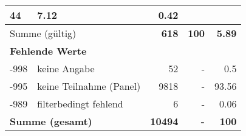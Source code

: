\begin{longtable}{lXrrr}
       \num{44} &
       \num[round-mode=places,round-precision=2]{7.12} &
         \num[round-mode=places,round-precision=2]{0.42} \\
     \midrule
     \multicolumn{2}{l}{Summe (gültig)} &
       \textbf{\num{618}} &
     \textbf{\num{100}} &
       \textbf{\num[round-mode=places,round-precision=2]{5.89}} \\
     \multicolumn{5}{l}{\textbf{Fehlende Werte}}\\
       -998 &
       keine Angabe &
         \num{52} &
        - &
         \num[round-mode=places,round-precision=2]{0.5} \\
       -995 &
       keine Teilnahme (Panel) &
         \num{9818} &
        - &
         \num[round-mode=places,round-precision=2]{93.56} \\
       -989 &
       filterbedingt fehlend &
         \num{6} &
        - &
         \num[round-mode=places,round-precision=2]{0.06} \\
     \midrule
     \multicolumn{2}{l}{\textbf{Summe (gesamt)}} &
          \textbf{\num{10494}} &
        \textbf{-} &
        \textbf{\num{100}} \\
     \bottomrule
     \end{longtable}
     

